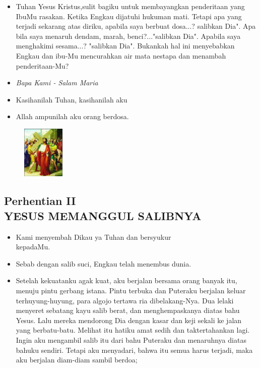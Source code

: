 \documentclass[a5paper,headsepline,titlepage,10pt,nnormalheadings,DIVcalc]{scrbook}
\newcommand{\BU}[1]{\begin{itemize} \item[U:] #1 \end{itemize}}
\newcommand{\BP}[1]{\begin{itemize} \item[P:] #1 \end{itemize}}
\begin{document}
\BU{ Tuhan Yesus Kristus,sulit bagiku untuk membayangkan penderitaan yang IbuMu rasakan. Ketika Engkau dijatuhi hukuman mati. Tetapi apa yang terjadi sekarang atas diriku, apabila saya berbuat dosa...? salibkan Dia". Apa bila saya menaruh dendam, marah, benci?..."salibkan Dia". Apabila saya menghakimi sesama...? "salibkan Dia". Bukankah hal ini menyebabkan Engkau dan ibu-Mu mencurahkan air mata nestapa dan menambah penderitaan-Mu?}
\large\begin{itemize}\item[~]\it{Bapa Kami - Salam Maria}\end{itemize}\normalsize

\BP{Kasihanilah Tuhan, kasihanilah aku}
\BU{Allah ampunilah aku orang berdosa.}



\begin{figure}
\includegraphics[width=2cm]{jalansalib_files/02_small.jpg}
\end{figure}
\subsection*{Perhentian II\\
YESUS MEMANGGUL SALIBNYA}


\BP{ Kami menyembah Dikau ya Tuhan dan bersyukur\\kepadaMu.}
\BU{ Sebab dengan salib suci, Engkau telah menembus dunia.}

\BP{ Setelah kekuatanku agak kuat, aku berjalan bersama orang banyak itu, menuju pintu gerbang istana. Pintu terbuka dan Puteraku berjalan keluar terhuyung-huyung, para algojo tertawa ria dibelakang-Nya. Dua lelaki menyeret sebatang kayu salib berat, dan menghempaskanya diatas bahu Yesus. Lalu mereka mendorong Dia dengan kasar dan keji sekali ke jalan yang berbatu-batu. Melihat itu hatiku amat sedih dan taktertahankan lagi. Ingin aku mengambil salib itu dari bahu Puteraku dan menaruhnya diatas bahuku sendiri. Tetapi aku menyadari, bahwa itu semua harus terjadi, maka aku berjalan diam-diam sambil berdoa;}
\end{document}
